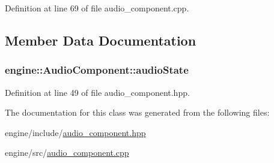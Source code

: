 Definition at line 69 of file audio\+\_\+component.\+cpp.



\subsection{Member Data Documentation}
\subsubsection[{\texorpdfstring{audio\+State}{audioState}}]{ engine\+::\+Audio\+Component\+::audio\+State}\hypertarget{classengine_1_1_audio_component_a78e6ef6497d0f325df7aab194a1ab449}{}\label{classengine_1_1_audio_component_a78e6ef6497d0f325df7aab194a1ab449}


Definition at line 49 of file audio\+\_\+component.\+hpp.



The documentation for this class was generated from the following files\+:\begin{DoxyCompactItemize}
\item 
engine/include/\hyperlink{audio__component_8hpp}{audio\+\_\+component.\+hpp}\item 
engine/src/\hyperlink{audio__component_8cpp}{audio\+\_\+component.\+cpp}\end{DoxyCompactItemize}
